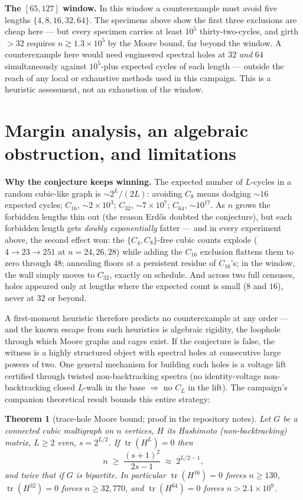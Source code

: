 \documentclass[11pt]{article}
\newtheorem{theorem}{Theorem}[section]
\theoremstyle{remark}
\newcommand{\Cyc}[1]{C_{#1}}
\begin{document}
\textbf{The $[65,127]$ window.} In this window a counterexample must avoid
five lengths $\{4,8,16,32,64\}$. The specimens above show the first three
exclusions are cheap here --- but every specimen carries at least $10^5$
thirty-two-cycles, and girth $>32$ requires $n \gtrsim 1.3\times10^5$ by the
Moore bound, far beyond the window. A counterexample here would need
engineered spectral holes at $32$ \emph{and} $64$ simultaneously against
$10^5$-plus expected cycles of each length --- outside the reach of any
local or exhaustive methods used in this campaign. This is a heuristic
assessment, not an exhaustion of the window.

\section{Margin analysis, an algebraic obstruction, and limitations}
\label{sec:outlook}

\textbf{Why the conjecture keeps winning.} The expected number of $L$-cycles
in a random cubic-like graph is ${\sim}2^L/(2L)$: avoiding $\Cyc8$ means
dodging ${\sim}16$ expected cycles; $\Cyc{16}$, ${\sim}2\times10^3$;
$\Cyc{32}$, ${\sim}7\times10^7$; $\Cyc{64}$, ${\sim}10^{17}$. As $n$ grows
the forbidden lengths thin out (the reason Erd\H{o}s doubted the
conjecture), but each forbidden length gets \emph{doubly exponentially}
fatter --- and in every experiment above, the second effect won: the
$\{\Cyc4,\Cyc8\}$-free cubic counts explode ($4 \to 23 \to 251$ at
$n=24,26,28$) while adding the $\Cyc{16}$ exclusion flattens them to zero
through $48$; annealing floors at a persistent residue of $\Cyc{16}$'s; in
the window, the wall simply moves to $\Cyc{32}$, exactly on schedule. And
across two full censuses, holes appeared only at lengths where the expected
count is small ($8$ and $16$), never at $32$ or beyond.

A first-moment heuristic therefore predicts no counterexample at any order
--- and the known escape from such heuristics is algebraic rigidity, the
loophole through which Moore graphs and cages exist. If the conjecture is
false, the witness is a highly structured object with spectral holes at
consecutive large powers of two. One general mechanism for building such
holes is a voltage lift certified through twisted non-backtracking spectra
(no identity-voltage non-backtracking closed $L$-walk in the base $\Rightarrow$
no $\Cyc L$ in the lift). The campaign's companion theoretical result
bounds this entire strategy:

\begin{theorem}[trace-hole Moore bound; proof in the repository notes]
\label{thm:tracemoore}
Let $G$ be a connected cubic multigraph on $n$ vertices, $H$ its Hashimoto
(non-backtracking) matrix, $L \ge 2$ even, $s = 2^{L/2}$. If
$\operatorname{tr}(H^L) = 0$ then
\[
n \;\ge\; \frac{(s+1)^2}{2s-1} \;\approx\; 2^{L/2-1},
\]
and twice that if $G$ is bipartite. In particular
$\operatorname{tr}(H^{16})=0$ forces $n \ge 130$,
$\operatorname{tr}(H^{32})=0$ forces $n \ge 32{,}770$, and
$\operatorname{tr}(H^{64})=0$ forces $n > 2.1\times10^9$.
\end{theorem}
\end{document}
